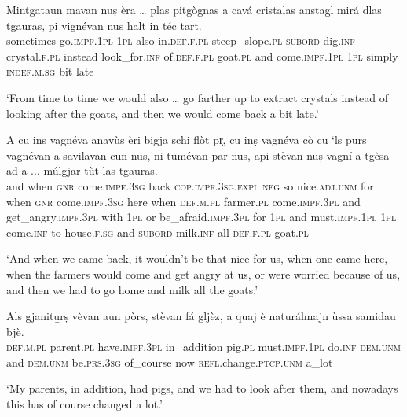 \begin{linenumbers}
\gll    Mintgataun mavan nuṣ èra … plas pitgògnas a cavá cristalas anstagl mirá dlas tgauras, pi vignévan nus halt in téc tart. \\
sometimes go.\textsc{impf.1pl} \textsc{1pl} also {} in.\textsc{def.f.pl} steep\_slope.\textsc{pl} \textsc{subord} dig.\textsc{inf} crystal.\textsc{f.pl} instead look\_for.\textsc{inf} of.\textsc{def.f.pl} goat.\textsc{pl} and come.\textsc{impf.1pl} \textsc{1pl} simply \textsc{indef.m.sg} bit late \\
\end{linenumbers}
\medskip
\glt `From time to time we would also … go farther up to extract crystals instead of looking after the goats, and then we would come back a bit late.'
\medskip

\begin{linenumbers}
\gll    A cu ins vagnéva anavù̱s èri bigja schi flòt pr̩, cu inṣ vagnéva cò cu `ls purs vagnévan a savilavan cun nus, ni tumévan par nus, api stèvan nuṣ vagní a tgèsa ad a ... múlgjar tùt las tgauras.\\
and when \textsc{gnr} come.\textsc{impf.3sg} back \textsc{cop.impf.3sg.expl} \textsc{neg} so nice.\textsc{adj.unm} for when \textsc{gnr} come.\textsc{impf.3sg} here when \textsc{def.m.pl} farmer.\textsc{pl} come.\textsc{impf.3pl} and get\_angry.\textsc{impf.3pl} with \textsc{1pl} or be\_afraid.\textsc{impf.3pl} for \textsc{1pl} and must.\textsc{impf.1pl} \textsc{1pl} come.\textsc{inf} to house.\textsc{f.sg} and {} \textsc{subord} milk.\textsc{inf} all \textsc{def.f.pl} goat.\textsc{pl}\\
\end{linenumbers}
\medskip
\glt `And when we came back, it wouldn’t be that nice for us, when one came here, when the farmers would come and get angry at us, or were worried because of us, and then we had to go home and milk all the goats.'
\medskip

\begin{linenumbers}
\gll Als gjanitu̱rṣ vèvan aun pòrs, stèvan fá gljèz, a quaj è naturálmajn ùssa samidau bjè. \\
 \textsc{def.m.pl} parent.\textsc{pl} have.\textsc{impf.3pl} in\_addition pig.\textsc{pl} must.\textsc{impf.1pl} do.\textsc{inf} \textsc{dem.unm} and \textsc{dem.unm} be.\textsc{prs.3sg} of\_course now \textsc{refl.}change.\textsc{ptcp.unm} a\_lot\\
\end{linenumbers}
\medskip
\glt `My parents, in addition, had pigs, and we had to look after them, and nowadays this has of course changed a lot.'
\medskip


